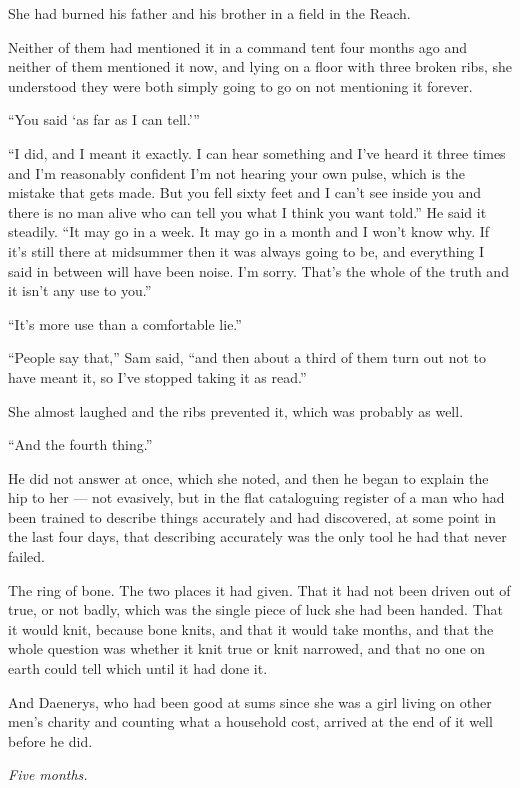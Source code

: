 She had burned his father and his brother in a field in the Reach.

Neither of them had mentioned it in a command tent four months ago and neither of them mentioned it now, and lying on a floor with three broken ribs, she understood they were both simply going to go on not mentioning it forever.

“You said ‘as far as I can tell.’”

“I did, and I meant it exactly. I can hear something and I’ve heard it three times and I’m reasonably confident I’m not hearing your own pulse, which is the mistake that gets made. But you fell sixty feet and I can’t see inside you and there is no man alive who can tell you what I think you want told.” He said it steadily. “It may go in a week. It may go in a month and I won’t know why. If it’s still there at midsummer then it was always going to be, and everything I said in between will have been noise. I’m sorry. That’s the whole of the truth and it isn’t any use to you.”

“It’s more use than a comfortable lie.”

“People say that,” Sam said, “and then about a third of them turn out not to have meant it, so I’ve stopped taking it as read.”

She almost laughed and the ribs prevented it, which was probably as well.

“And the fourth thing.”

\sceneBreak

He did not answer at once, which she noted, and then he began to explain the hip to her — not evasively, but in the flat cataloguing register of a man who had been trained to describe things accurately and had discovered, at some point in the last four days, that describing accurately was the only tool he had that never failed.

The ring of bone. The two places it had given. That it had not been driven out of true, or not badly, which was the single piece of luck she had been handed. That it would knit, because bone knits, and that it would take months, and that the whole question was whether it knit true or knit narrowed, and that no one on earth could tell which until it had done it.

And Daenerys, who had been good at sums since she was a girl living on other men’s charity and counting what a household cost, arrived at the end of it well before he did.

\textit{Five months.}

